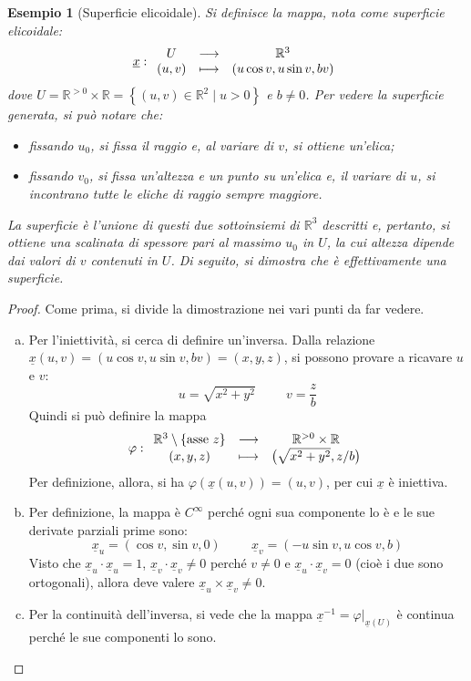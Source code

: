 \documentclass[12pt]{scrartcl}
\theoremstyle{style}
\newtheorem{esempio}{Esempio}[section]
\numberwithin{equation}{subsection}
\begin{document}
\begin{esempio}
	[Superficie elicoidale]
	Si definisce la mappa, nota come \textit{superficie elicoidale}:
	\[
	\underline{x}:
	\begin{array}
		{c c c}
		U&\longrightarrow & \mathbb{R}^3\\
		(u,v) & \longmapsto & (u \cos v, u \sin v , b v)
	\end{array}
	\] 
	dove $U = \mathbb{R}^{>0} \times \mathbb{R} = \left\{ (u,v)\in \mathbb{R}^2  \mid  u >0 \right\} $ e $b \neq 0$.
	Per vedere la superficie generata, si pu\`o notare che:
	\begin{itemize}
		\item fissando $u_0$, si fissa il raggio e, al variare di $v$, si ottiene un'elica;
		\item fissando $v_0$, si fissa un'altezza e un punto su un'elica e, il variare di $u$, si incontrano tutte le eliche di raggio sempre maggiore.
	\end{itemize}
	La superficie \`e l'unione di questi due sottoinsiemi di $\mathbb{R}^3$ descritti e, pertanto, si ottiene una scalinata di spessore pari al massimo $u_0$ in $U$, la cui altezza dipende dai valori di $v$ contenuti in $U$.
	Di seguito, si dimostra che \`e effettivamente una superficie.
\end{esempio}
\begin{proof}
	Come prima, si divide la dimostrazione nei vari punti da far vedere.
	\begin{enumerate}[(a).]
		\item Per l'iniettivit\`a, si cerca di definire un'inversa.
			Dalla relazione $\underline{x}(u,v) = (u \cos v , u \sin v , b v ) = (x,y,z)$, si possono provare a ricavare $u$ e $v$:
			\[
			u = \sqrt{x^2 + y^2} \hspace{1cm}v = \frac{z}{b}
			\] 
			Quindi si pu\`o definire la mappa 
			\[
			\varphi : 
			\begin{array}
				{c c c}
				\mathbb{R}^3 \setminus \left\{ \text{asse } z \right\} & \longrightarrow & \mathbb{R}^{>0} \times \mathbb{R}\\
				(x,y,z) & \longmapsto & \big(\sqrt{x^2 + y^2} , z / b\big)
			\end{array}
			\] 
			Per definizione, allora, si ha $\varphi (\underline{x}(u,v)) = (u,v)$, per cui $\underline{x}$ \`e iniettiva.
		\item Per definizione, la mappa \`e $C^\infty$ perch\'e ogni sua componente lo \`e e le sue derivate parziali prime sono:
			\[
			\underline{x}_u = (\cos v, \sin v , 0) \hspace{1cm}\underline{x}_v = (- u \sin v , u \cos v , b)
			\] 
			Visto che $\underline{x}_u \cdot \underline{x}_u = 1$, $\underline{x}_v \cdot  \underline{x}_v \neq 0$ perch\'e $v\neq 0$ e $\underline{x}_u \cdot \underline{x}_v = 0$ (cio\`e i due sono ortogonali), allora deve valere $\underline{x}_u \times \underline{x}_v \neq 0$.
		\item Per la continuit\`a dell'inversa, si vede che la mappa $\underline{x}^{-1} = \varphi |_{\underline{x}(U)} $ \`e continua perch\'e le sue componenti lo sono.
	\end{enumerate}
\end{proof}
\end{document}
